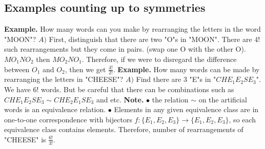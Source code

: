 \documentclass{article}
\begin{document}
\subsection{Examples counting up to symmetries}
\textbf{Example. } How many words can you make by rearranging the letters in the word "MOON"?
\newline
\newline
$A) $ First, distinguish that there are two "O"s in "MOON". There are $4!$ such rearrangements but they come in pairs. (swap one O with the other O).
\newline
$MO_1NO_2$ then $MO_2NO_1$.
\newline
Therefore, if we were to disregard the difference between $O_1$ and $O_2$, then we get $\frac{4!}{2!}.$
\newline
\newline
\textbf{Example. } How many words can be made by rearranging the letters in "CHEESE"? 
\newline
\newline
$A) $ Find there are 3 "E"s in "$CHE_1E_2SE_3$". 
\newline
We have $6!$ words. But be careful that there can be combinations such as $CHE_1E_2SE_3 \sim CHE_2E_1SE_3$ and etc. 
\newline
\newline
\textbf{Note. }
\newline
$\bullet $ the relation $\sim$ on the artificial words is an equivalence relation. 
\newline
$\bullet $ Elements in any given equivalence class are in one-to-one correspondence with bijectors $f: \{ E_1, E_2, E_3 \} \rightarrow \{ E_1, E_2, E_3\}$, so each equivalence
class contains elements. 
\newline
\newline
Therefore, number of rearrangements of "CHEESE" is $\frac{6!}{3!}.$
\newpage
\end{document}
